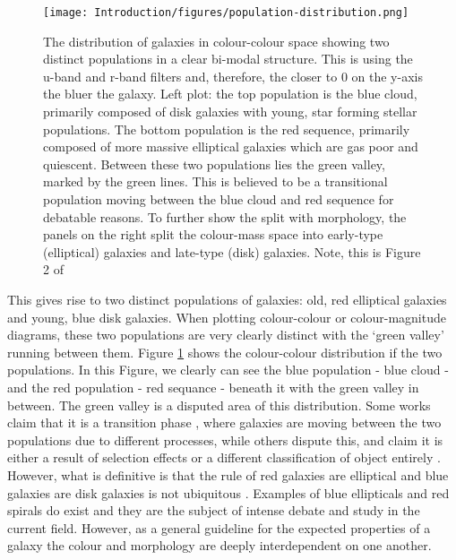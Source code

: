 \begin{figure}
    \centering
    \texttt{[image: Introduction/figures/population-distribution.png]}
    \caption{The distribution of galaxies in colour-colour space showing two distinct populations in a clear bi-modal structure. This is using the u-band and r-band filters and, therefore, the closer to 0 on the y-axis the bluer the galaxy. Left plot: the top population is the blue cloud, primarily composed of disk galaxies with young, star forming stellar populations. The bottom population is the red sequence, primarily composed of more massive elliptical galaxies which are gas poor and quiescent. Between these two populations lies the green valley, marked by the green lines. This is believed to be a transitional population moving between the blue cloud and red sequence for debatable reasons. To further show the split with morphology, the panels on the right split the colour-mass space into early-type (elliptical) galaxies and late-type (disk) galaxies. Note, this is Figure 2 of \citet{2014MNRAS.440..889S}}
    \label{fig:blue-red-population}
\end{figure}

This gives rise to two distinct populations of galaxies: old, red elliptical galaxies and young, blue disk galaxies. When plotting colour-colour or colour-magnitude diagrams, these two populations are very clearly distinct with the `green valley' running between them. Figure \ref{fig:blue-red-population} shows the colour-colour distribution if the two populations. In this Figure, we clearly can see the blue population - blue cloud - and the red population - red sequance - beneath it with the green valley in between. The green valley is a disputed area of this distribution. Some works claim that it is a transition phase \citep{Papers green valley stuff. Start with Becky's work.}, where galaxies are moving between the two populations due to different processes, while others dispute this, and claim it is either a result of selection effects \citep{I think this is the red herring paper} or a different classification of object entirely \citep{Or this is the red herring paper}. However, what is definitive is that the rule of red galaxies are elliptical and blue galaxies are disk galaxies is not ubiquitous \citep{2022MNRAS.510.4126S}. Examples of blue ellipticals and red spirals do exist \citep{2022AJ....163..150K} and they are the subject of intense debate and study in the current field. However, as a general guideline for the expected properties of a galaxy the colour and morphology are deeply interdependent on one another.


